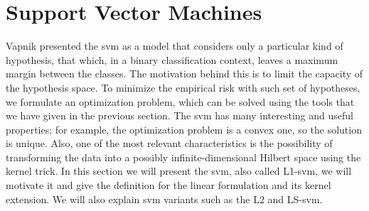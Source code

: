 \section{Support Vector Machines}\label{sec:ch2_svms}
Vapnik presented the \acrfull{svm} as a model that considers only a particular kind of hypothesis, that which, in a binary classification context, leaves a maximum margin between the classes. The motivation behind this is to limit the capacity of the hypothesis space. To minimize the empirical risk with such set of hypotheses, we formulate an optimization problem, which can be solved using the tools that we have given in the previous section. The \acrshort{svm} has many interesting and useful properties; for example, the optimization problem is a convex one, so the solution is unique. Also, one of the most relevant characteristics is the possibility of transforming the data into a possibly infinite-dimensional Hilbert space using the kernel trick.
In this section we will present the \acrshort{svm}, also called L1-\acrshort{svm}, we will motivate it and give the definition for the linear formulation and its kernel extension. We will also explain \acrshort{svm} variants such as the L2 and LS-\acrshort{svm}.

